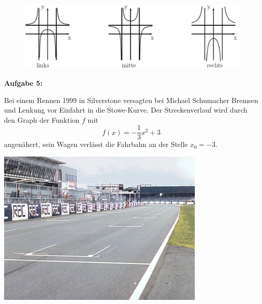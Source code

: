 \documentclass[a4paper,12pt]{article}
\newcommand{\Aufgabe}[1]{
  {
  \vspace*{0.5cm}
  \textsf{\textbf{Aufgabe #1}}
  \vspace*{0.2cm}
  
  }
}
\begin{document}
\begin{figure}[h!]
  \begin{center}
    \includegraphics[width=1 \linewidth]{Q11_1KlausurJanuar2022_2.png}
  \end{center}
\end{figure}


\newpage

\Aufgabe{5:}

\noindent
\begin{minipage}{0.6\textwidth}%
Bei einem Rennen 1999 in Silverstone versagten bei Michael Schumacher Bremsen und Lenkung vor Einfahrt in die Stowe-Kurve. Der Streckenverlauf wird durch den Graph der Funktion $f$ mit
\[f(x)=-\frac{1}{3}x^2+3 \]
angenähert, sein Wagen verlässt die Fahrbahn an der Stelle $x_0 = -3$.
\end{minipage}
\hfill%
\begin{minipage}{0.3\textwidth}%
\includegraphics[width=\linewidth]{Q11_1KlausurJanuar2022_3.png}
\end{minipage}%


\end{document}
